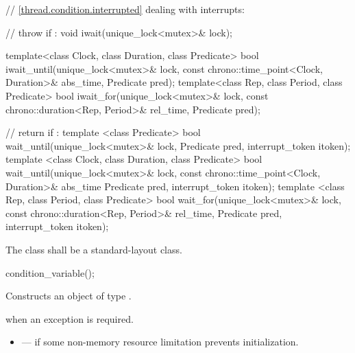 {\color{insertcolor}
\begin{codeblock}
    // \ref{thread.condition.interrupted} dealing with interrupts:

    // throw  if :
    void iwait(unique_lock<mutex>& lock);

    template<class Clock, class Duration, class Predicate>
      bool iwait_until(unique_lock<mutex>& lock,
                       const chrono::time_point<Clock, Duration>& abs_time,
                       Predicate pred);
    template<class Rep, class Period, class Predicate>
      bool iwait_for(unique_lock<mutex>& lock,
                     const chrono::duration<Rep, Period>& rel_time,
                     Predicate pred);

    // return  if :
    template <class Predicate>
      bool wait_until(unique_lock<mutex>& lock,
                      Predicate pred,
                      interrupt_token itoken);
    template <class Clock, class Duration, class Predicate>
      bool wait_until(unique_lock<mutex>& lock,
                      const chrono::time_point<Clock, Duration>& abs_time
                      Predicate pred,
                      interrupt_token itoken);
    template <class Rep, class Period, class Predicate>
      bool wait_for(unique_lock<mutex>& lock,
                    const chrono::duration<Rep, Period>& rel_time,
                    Predicate pred,
                    interrupt_token itoken);
\end{codeblock}
}
\begin{codeblock}
    using native_handle_type = @\impdefnc@;          // see~\ref{thread.req.native}
    native_handle_type native_handle();                         // see~\ref{thread.req.native}
  };
}
\end{codeblock}


\pnum
The class  shall be a standard-layout class.

%
\begin{itemdecl}
condition_variable();
\end{itemdecl}

\begin{itemdescr}
\pnum
\effects Constructs an object of type .

\pnum
\throws {} when an exception is required.

\pnum
\errors
\begin{itemize}
\item {} --- if some non-memory resource
limitation prevents initialization.
\end{itemize}
\end{itemdescr}

